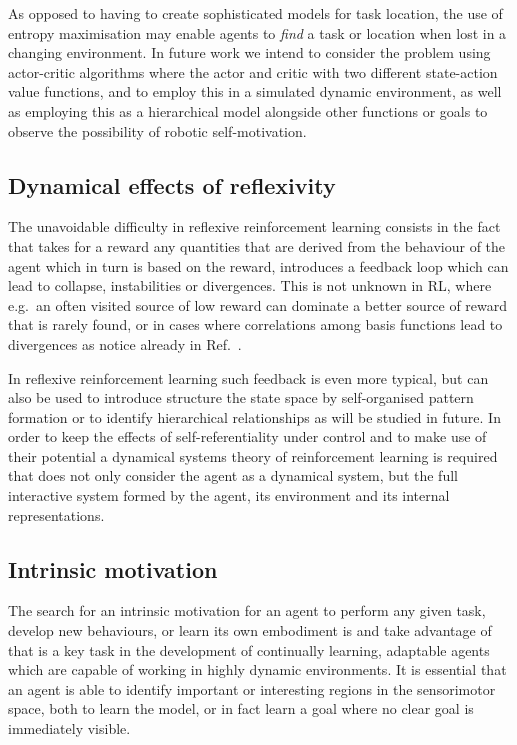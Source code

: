 \documentclass{article}
\begin{document}
As opposed to having to create sophisticated models for task location, the use of entropy maximisation may enable agents to \emph{find} a task or location when lost in a changing environment. In future work we intend to consider the problem using actor-critic algorithms where the actor and critic with two different state-action value functions, and to employ this in a simulated dynamic environment, as well as employing this as a hierarchical model alongside other functions or goals to observe the possibility of robotic self-motivation.

\subsection{Dynamical effects of reflexivity}

The unavoidable difficulty in reflexive reinforcement learning consists in the 
fact that takes for a reward any quantities that are derived from the behaviour of the agent
which in turn is based on the reward,
introduces a feedback loop which can lead to collapse, instabilities or divergences. 
This is not unknown in RL, where e.g.~an often visited source of low reward can dominate a better source of reward that is rarely found, or in cases where correlations among basis functions lead to divergences as notice already in Ref.~\cite{baird1995residual}. 

In reflexive reinforcement learning such 
feedback is even more typical, but can also be used to introduce structure the 
state space by self-organised pattern formation or to identify hierarchical 
relationships as will be studied in future. In order to keep the effects of 
self-referentiality under control and to make use of their potential
a dynamical systems theory of reinforcement learning is required that 
does not only consider the agent as a dynamical system, but the full interactive 
system formed by the agent, its environment and its internal representations.

\subsection{Intrinsic motivation}
The search for an intrinsic motivation for an agent to perform any given task, develop new behaviours, or learn its own embodiment is and take advantage of that is a key task in the development of continually learning, adaptable agents which are capable of working in highly dynamic environments. It is essential that an agent is able to identify important or interesting regions in the sensorimotor space, both to learn the model, or in fact learn a goal where no clear goal is immediately visible. 
\end{document}
